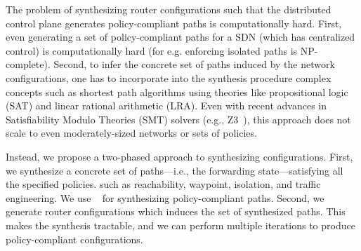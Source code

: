 

The problem of synthesizing router configurations
such that the distributed control plane  
generates policy-compliant paths 
is computationally hard. 
First, even generating a set of policy-compliant 
paths for a SDN (which has centralized control) is 
computationally hard (for e.g. enforcing isolated
paths is NP-complete). 
Second, to infer the concrete
set of paths induced by the network configurations, 
one has to incorporate
into the synthesis procedure 
complex concepts such as shortest path algorithms
using theories like propositional logic (SAT) 
and linear rational
arithmetic (LRA). Even with recent 
advances in Satisfiability Modulo Theories
(SMT) solvers (e.g., Z3~\cite{z3}), 
this approach does not scale to
even moderately-sized networks or 
sets of policies.


Instead, we propose 
a two-phased approach to synthesizing configurations.
 First, we synthesize a concrete set of paths---i.e., 
 the forwarding state---satisfying  
all the specified policies.
such as reachability, waypoint, isolation, and
traffic engineering. We use  
\genesis~\cite{genesis} for
synthesizing policy-compliant paths. 
Second, we generate router configurations which
induces the set of synthesized paths. This makes the synthesis 
tractable, and we can perform multiple iterations 
to produce policy-compliant configurations. 


